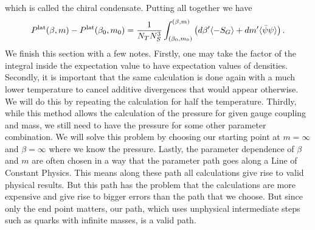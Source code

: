 which is called the chiral condensate. Putting all together we have
\begin{equation}
    P^{\text{lat}}(\beta, m)-P^{\text{lat}}(\beta_0,m_0)=\frac{1}{N_TN_S^3}\int_{(\beta_0,m_0)}^{(\beta,m)}\left(d\beta'\langle-S_G\rangle+dm'\langle\bar\psi\psi\rangle\right). 
\end{equation}
We finish this section with a few notes. Firstly, one may take the factor of the integral inside the expectation value to have expectation values of densities. Secondly, it is important that the same calculation is done again with a much lower temperature to cancel additive divergences that would appear otherwise. We will do this by repeating the calculation for half the temperature. Thirdly, while this method allows the calculation of the pressure for given gauge coupling and mass, we still need to have the pressure for some other parameter combination. We will solve this problem by choosing our starting point at $m=\infty$ and $\beta=\infty$ where we know the pressure. Lastly, the parameter dependence of $\beta$ and $m$ are often chosen in a way that the parameter path goes along a Line of Constant Physics. This means along these path all calculations give rise to valid physical results. But this path has the problem that the calculations are more expensive and give rise to bigger errors than the path that we choose. But since only the end point matters, our path, which uses unphysical intermediate steps such as quarks with infinite masses, is a valid path. \cite{integralMethod}


